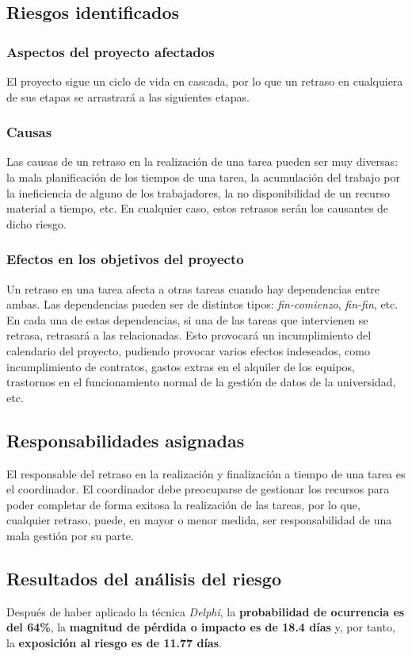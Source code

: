 \documentclass[11pt,a4paper,spanish,twoside]{book}
\begin{document}
\subsection{Riesgos identificados}
\subsubsection{Aspectos del proyecto afectados}
El proyecto sigue un ciclo de vida en cascada, por lo que un retraso en 
cualquiera de sus etapas se arrastrará a las siguientes etapas.

\subsubsection{Causas}
Las causas de un retraso en la realización de una tarea pueden ser muy
diversas: la mala planificación de los tiempos de una tarea, la acumulación del trabajo por la ineficiencia de alguno de los trabajadores, la no disponibilidad
de un recurso material a tiempo, etc. En cualquier caso, estos retrasos serán
los causantes de dicho riesgo.

\subsubsection{Efectos en los objetivos del proyecto}
Un retraso en una tarea afecta a otras tareas cuando hay dependencias entre
ambas. Las dependencias pueden ser de distintos tipos: \emph{fin-comienzo}, 
\emph{fin-fin}, etc. En cada una de estas dependencias, si una de las tareas
que intervienen se retrasa, retrasará a las relacionadas. Esto provocará un
incumplimiento del calendario del proyecto, pudiendo provocar varios efectos
indeseados, como incumplimiento de contratos, gastos extras en el alquiler de
los equipos, trastornos en el funcionamiento normal de la gestión de datos de
la universidad, etc.

\subsection{Responsabilidades asignadas}
El responsable del retraso en la realización y finalización a tiempo de una
tarea es el coordinador. El coordinador debe preocuparse de gestionar los
recursos para poder completar de forma exitosa la realización de las
tareas, por lo que, cualquier retraso, puede, en mayor o menor medida, ser
responsabilidad de una mala gestión por su parte.

\subsection{Resultados del análisis del riesgo}
Después de haber aplicado la técnica \emph{Delphi}, la \textbf{probabilidad de
ocurrencia es del 64\%}, la \textbf{magnitud de pérdida o impacto es de 18.4
días } y, por tanto, la \textbf{exposición al riesgo es de 11.77 días}.
\end{document}
